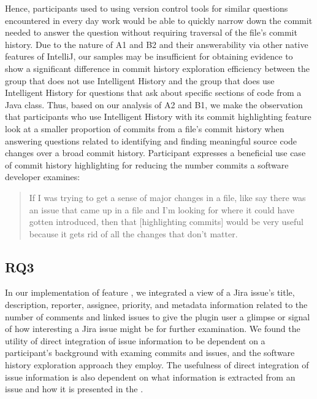 Hence, participants used to using version control tools for similar questions encountered in every day work would be able to quickly narrow down the commit needed to answer the question without requiring traversal of the file's commit history.
Due to the nature of A1 and B2 and their answerability via other native features of IntelliJ, our samples may be insufficient for obtaining evidence to show a significant difference in commit history exploration efficiency between the group that does not use Intelligent History and the group that does use Intelligent History for questions that ask about specific sections of code from a Java class.
Thus, based on our analysis of A2 and B1, we make the observation that participants who use Intelligent History with its commit highlighting feature look at a smaller proportion of commits from a file's commit history when answering questions related to
identifying and finding meaningful source code changes over a broad commit history.
Participant  expresses a beneficial use case of commit history highlighting for reducing the number commits a software developer examines:

\begin{quote}
  If I was trying to get a sense of major changes in a file, like say there was an issue that came up in a file and I’m looking for where it could have gotten introduced, 
  then that [highlighting commits] would be very useful because it gets rid of all the changes that don’t matter. 
\end{quote}


\subsection{RQ3}
\label{subsec:RQ3}

In our implementation of feature , we integrated a view of a Jira issue's title, description, reporter, assignee, priority,
and metadata information related to the number of comments and linked issues to give the plugin user a glimpse or signal of how interesting a Jira issue might be for further examination.
We found the utility of direct integration of issue information to be dependent on a participant's background with examing commits and issues,
and the software history exploration approach they employ.
The usefulness of direct integration of issue information is also dependent on what information is extracted from an issue and how it is presented in the .

